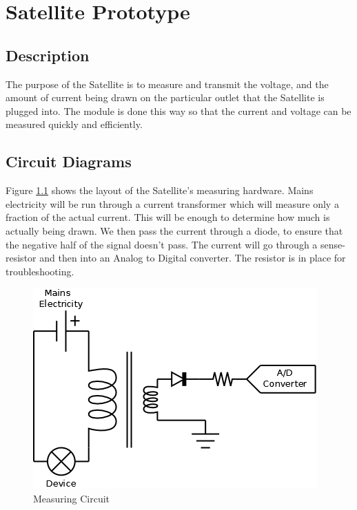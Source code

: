 
\chapter{Satellite Prototype}

\section{Description}

The purpose of the Satellite is to measure and transmit the voltage,
and the amount of current being drawn on the particular outlet that 
the Satellite is plugged into. The module is done this way so that
the current and voltage can be measured quickly and efficiently.


\section{Circuit Diagrams}

Figure \ref{MeasuringCircuit} shows the layout of the Satellite's 
measuring hardware. Mains electricity will be run through a current
transformer which will measure only a fraction of the actual current. 
This will be enough to determine how much is actually being drawn. 
We then pass the current through a diode, to ensure that the negative half of the signal doesn't pass. 
The current will go through a sense-resistor and then into an Analog to Digital converter. 
The resistor is in place for troubleshooting. 

\begin{figure}[H]
\centering
\includegraphics[scale=0.3]{Hardware/images/MeasureCircuit.png}
\caption{Measuring Circuit}
\label{MeasuringCircuit}
\end{figure}

